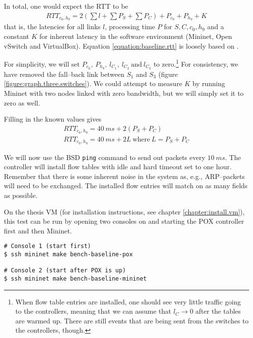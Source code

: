 In total, one would expect the \acf{RTT} to be
\begin{gather}
  RTT_{c_0, h_9} = 2\left( \sum l + \sum P_S + \sum P_C \right) + P_{c_0} + P_{h_9} + K
  \label{equation:baseline.rtt}
\end{gather}%
that is, the latencies for all links $l$, processing time $P$ for
$S,C,c_0,h_9$ and a constant $K$ for inherent latency in the software
environment (Mininet, Open vSwitch and VirtualBox).  Equation
\ref{equation:baseline.rtt} is loosely based on
\cite{DBLP:conf/cnsm/PhemiusB13}.

For simplicity, we will set $P_{c_0},~P_{h_9},~l_{C_1},~l_{C_2}~\text{and}~
l_{C_3}$ to zero.\footnote{When flow table entries are installed, one should
see very little traffic going to the controllers, meaning that we can
assume that $l_{C} \to 0$ after the tables are warmed up.
There are still events that are being sent from the switches to the
controllers, though.}
For consistency, we have removed the fall--back link
between $S_1$ and $S_3$ (figure \ref{figure:graph.three.switches}).
We could attempt to measure $K$ by running Mininet with two nodes linked
with zero bandwidth, but we will simply set it to zero as well.

Filling in the known values gives
\begin{gather}
  RTT_{c_0,h_9} = 40~ms + 2\left( P_S + P_C \right)
  \\
  RTT_{c_0,h_9} = 40~ms + 2L~\text{where}~L = P_S + P_C
  \label{equation:expected.baseline.rtt}
\end{gather}

We will now use the BSD \texttt{ping} command to send out packets every
$10~ms$.  The controller will install flow tables with idle and hard timeout
set to one hour.  Remember that there is some inherent noise in the system
as, e.g., ARP--packets will need to be exchanged.  The installed flow
entries will match on as many fields as possible.

On the thesis VM (for installation instructions, see chapter
\ref{chapter:install.vm}), this test can be run by opening two consoles on
and starting the POX controller first and then Mininet.

\begin{Verbatim}
# Console 1 (start first)
$ ssh mininet make bench-baseline-pox

# Console 2 (start after POX is up)
$ ssh mininet make bench-baseline-mininet
\end{Verbatim}

